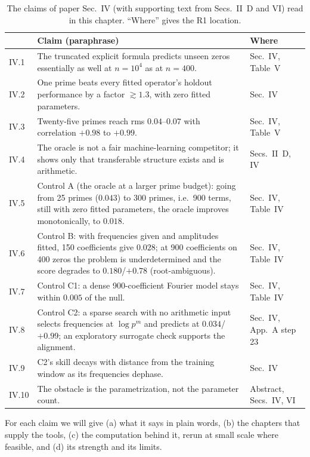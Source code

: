\begin{table}[htbp]\centering\small
\caption{The claims of paper Sec.~IV (with supporting text from Secs.~II~D and VI) read in this chapter. ``Where'' gives the R1 location.}\label{tab:paper-arithmetic-claims}
\begin{tabular}{p{0.6cm}p{8.2cm}p{2.6cm}}
\toprule
 & Claim (paraphrase) & Where \\
\midrule
IV.1 & The truncated explicit formula predicts unseen zeros essentially as well at $n=10^4$ as at $n=400$. & Sec.~IV, Table~V \\
IV.2 & One prime beats every fitted operator's holdout performance by a factor $\gtrsim 1.3$, with zero fitted parameters. & Sec.~IV \\
IV.3 & Twenty-five primes reach rms $0.04$--$0.07$ with correlation $+0.98$ to $+0.99$. & Sec.~IV, Table~V \\
IV.4 & The oracle is not a fair machine-learning competitor; it shows only that transferable structure exists and is arithmetic. & Secs.~II~D, IV \\
IV.5 & Control A (the oracle at a larger prime budget): going from 25 primes ($0.043$) to 300 primes, i.e.\ 900 terms, still with zero fitted parameters, the oracle improves monotonically, to $0.018$. & Sec.~IV, Table~IV \\
IV.6 & Control B: with frequencies given and amplitudes fitted, 150 coefficients give $0.028$; at 900 coefficients on 400 zeros the problem is underdetermined and the score degrades to $0.180$/$+0.78$ (root-ambiguous). & Sec.~IV, Table~IV \\
IV.7 & Control C1: a dense 900-coefficient Fourier model stays within $0.005$ of the null. & Sec.~IV, Table~IV \\
IV.8 & Control C2: a sparse search with no arithmetic input selects frequencies at $\log p^m$ and predicts at $0.034$/$+0.99$; an exploratory surrogate check supports the alignment. & Sec.~IV, App.~A step 23 \\
IV.9 & C2's skill decays with distance from the training window as its frequencies dephase. & Sec.~IV \\
IV.10 & The obstacle is the parametrization, not the parameter count. & Abstract, Secs.~IV, VI \\
\bottomrule
\end{tabular}
\end{table}

For each claim we will give (a) what it says in plain words, (b) the chapters that supply the tools, (c) the computation behind it, rerun at small scale where feasible, and (d) its strength and its limits.

